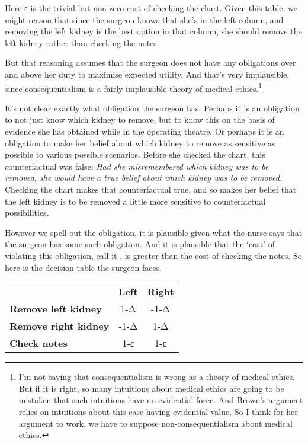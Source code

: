 \documentclass[
  10pt,
  letterpaper,
  DIV=11,
  numbers=noendperiod,
  twoside]{scrartcl}
\begin{document}
Here ε is the trivial but non-zero cost of checking the chart. Given
this table, we might reason that since the surgeon knows that she's in
the left column, and removing the left kidney is the best option in that
column, she should remove the left kidney rather than checking the
notes.

But that reasoning assumes that the surgeon does not have any
obligations over and above her duty to maximise expected utility. And
that's very implausible, since consequentialism is a fairly implausible
theory of medical ethics.\footnote{I'm not saying that consequentialism
  is wrong as a theory of medical ethics. But if it is right, so many
  intuitions about medical ethics are going to be mistaken that such
  intuitions have no evidential force. And Brown's argument relies on
  intuitions about this case having evidential value. So I think for her
  argument to work, we have to suppose non-consequentialism about
  medical ethics.}

It's not clear exactly what obligation the surgeon has. Perhaps it is an
obligation to not just know which kidney to remove, but to know this on
the basis of evidence she has obtained while in the operating theatre.
Or perhaps it is an obligation to make her belief about which kidney to
remove as sensitive as possible to various possible scenarios. Before
she checked the chart, this counterfactual was false: \emph{Had she
misremembered which kidney was to be removed, she would have a true
belief about which kidney was to be removed.} Checking the chart makes
that counterfactual true, and so makes her belief that the left kidney
is to be removed a little more sensitive to counterfactual
possibilities.

However we spell out the obligation, it is plausible given what the
nurse says that the surgeon has some such obligation. And it is
plausible that the `cost' of violating this obligation, call it , is
greater than the cost of checking the notes. So here is the decision
table the surgeon faces.

\begin{longtable}[]{@{}lcc@{}}
\toprule\noalign{}
\endhead
\bottomrule\noalign{}
\endlastfoot
& \textbf{Left} & \textbf{Right} \\
\textbf{Remove left kidney} & 1-Δ & -1-Δ \\
\textbf{Remove right kidney} & -1-Δ & 1-Δ \\
\textbf{Check notes} & 1-ε & 1-ε \\
\end{longtable}
\end{document}
